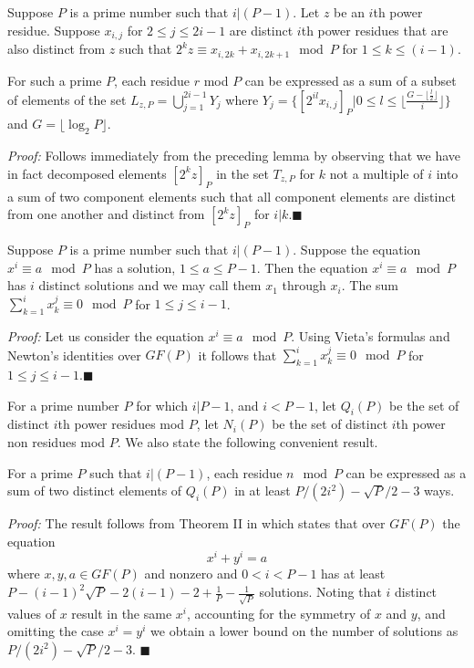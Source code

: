 \begin{lemma}\label{generates1} Suppose $P$ is a prime number such that $i|(P-1)$.
Let $z$ be an $i$th power residue. Suppose $x_{i,j}$ for $2 \leq j
\leq 2i-1$ are distinct $i$th power residues that are also
distinct from $z$ such that $2^{k}z \equiv x_{i,2k}+x_{i,2k+1}
\mod P$ for $1 \leq k \leq(i-1)$.

For such a prime $P$, each residue $r$ mod $P$ can be expressed as
a sum of a subset of elements of the set $L_{z,P}=
\bigcup_{j=1}^{2i-1} Y_j$ where $Y_j =\{[2^{il}x_{i,j}]_P| 0 \leq
l \leq \lfloor \frac{G-\lfloor \frac{l}{2}\rfloor}{i}\rfloor\}$
and $G=\lfloor \log_2 P \rfloor $.
\end{lemma}
\noindent \textit{Proof:} Follows immediately from the preceding
lemma by observing that we have in fact decomposed elements
$[2^{k}z]_P$ in the set $T_{z,P}$ for $k$ not a multiple of $i$
into a sum of two component elements such that all component
elements are distinct from one another and distinct from
$[2^kz]_P$ for $i|k$.\hfill$\blacksquare$



\begin{lemma}\label{sums} Suppose $P$ is a prime number such that $i|(P-1)$. Suppose the
equation $x^i\equiv a \mod P$ has a solution, $1 \leq a \leq P-1$.
Then the equation $x^i\equiv a \mod P$ has $i$ distinct solutions
\cite{apostol} and we may call them $x_1$ through $x_i$. The sum
$\sum_{k=1}^i x_k^j \equiv 0 \mod P$ for $1 \leq j \leq i-1$.
\end{lemma}
\noindent \textit{Proof:} Let us consider the equation $x^i \equiv
a \mod P$. Using Vieta's formulas and Newton's identities over
$GF(P)$ it follows that
 $\sum_{k=1}^i x_k^j \equiv 0 \mod P$ for $1 \leq j \leq
i-1$.\hfill$\blacksquare$

For a prime number $P$ for which $i|P-1$, and $i<P-1$, let
$Q_i(P)$ be the set of distinct $i$th power residues mod $P$, let
$N_i(P)$ be the set of distinct $i$th power non residues mod $P$.
We also state the following convenient result.
\begin{lemma}\label{sums1}
For a prime $P$ such that $i | (P-1)$, each residue $n \mod P$ can
be expressed as a sum of two distinct elements of $Q_i(P)$ in at
least $P/(2i^2)-\sqrt{P}/2-3$ ways.
\end{lemma}
\noindent \textit{Proof:} The result follows from Theorem II in
\cite{huavan:49} which states that over $GF(P)$ the equation
\begin{equation}\label{hua} x^i+y^i=a
\end{equation} where $x,y,a \in GF(P)$ and nonzero and $0 < i <P-1 $
has at least
$P-(i-1)^2\sqrt{P}-2(i-1)-2+\frac{1}{P}-\frac{1}{\sqrt{P}}$
solutions. Noting that $i$ distinct values of $x$ result in the
same $x^i$, accounting for the symmetry of $x$ and $y$, and
omitting the case $x^i=y^i$ we obtain a lower bound on the number
of solutions as $P/(2i^2)-\sqrt{P}/2-3$. \hfill$\blacksquare$


